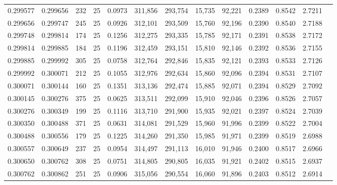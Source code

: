 \begin{tabular}{rrrrrrrrrrrrr}
0.299577 & 0.299656 &   232 &  25 &                                     0.0973 & 311,856 & 293,754 &  15,735 &  92,221 & 0.2389 & 0.8542 & 2.7211 \\
0.299656 & 0.299747 &   245 &  25 &                                     0.0926 & 312,101 & 293,509 &  15,760 &  92,196 & 0.2390 & 0.8540 & 2.7188 \\
0.299748 & 0.299814 &   174 &  25 &                                     0.1256 & 312,275 & 293,335 &  15,785 &  92,171 & 0.2391 & 0.8538 & 2.7172 \\
0.299814 & 0.299885 &   184 &  25 &                                     0.1196 & 312,459 & 293,151 &  15,810 &  92,146 & 0.2392 & 0.8536 & 2.7155 \\
0.299885 & 0.299992 &   305 &  25 &                                     0.0758 & 312,764 & 292,846 &  15,835 &  92,121 & 0.2393 & 0.8533 & 2.7126 \\
0.299992 & 0.300071 &   212 &  25 &                                     0.1055 & 312,976 & 292,634 &  15,860 &  92,096 & 0.2394 & 0.8531 & 2.7107 \\
0.300071 & 0.300144 &   160 &  25 &                                     0.1351 & 313,136 & 292,474 &  15,885 &  92,071 & 0.2394 & 0.8529 & 2.7092 \\
0.300145 & 0.300276 &   375 &  25 &                                     0.0625 & 313,511 & 292,099 &  15,910 &  92,046 & 0.2396 & 0.8526 & 2.7057 \\
0.300276 & 0.300349 &   199 &  25 &                                     0.1116 & 313,710 & 291,900 &  15,935 &  92,021 & 0.2397 & 0.8524 & 2.7039 \\
0.300350 & 0.300488 &   371 &  25 &                                     0.0631 & 314,081 & 291,529 &  15,960 &  91,996 & 0.2399 & 0.8522 & 2.7004 \\
0.300488 & 0.300556 &   179 &  25 &                                     0.1225 & 314,260 & 291,350 &  15,985 &  91,971 & 0.2399 & 0.8519 & 2.6988 \\
0.300557 & 0.300649 &   237 &  25 &                                     0.0954 & 314,497 & 291,113 &  16,010 &  91,946 & 0.2400 & 0.8517 & 2.6966 \\
0.300650 & 0.300762 &   308 &  25 &                                     0.0751 & 314,805 & 290,805 &  16,035 &  91,921 & 0.2402 & 0.8515 & 2.6937 \\
0.300762 & 0.300862 &   251 &  25 &                                     0.0906 & 315,056 & 290,554 &  16,060 &  91,896 & 0.2403 & 0.8512 & 2.6914 \\

\end{tabular}
